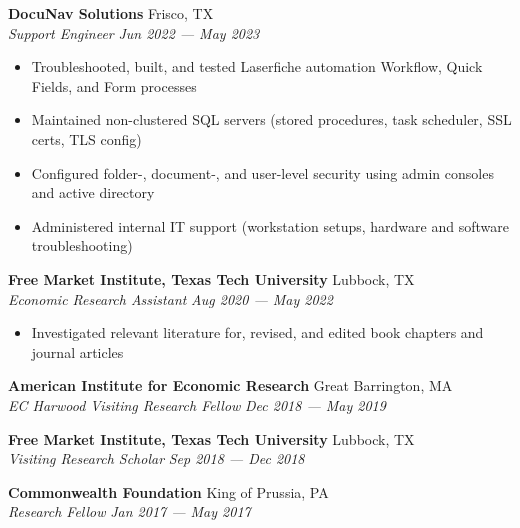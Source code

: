 \documentclass[a4paper,11pt]{article}
\begin{document}
\textbf{DocuNav Solutions} \hfill Frisco, TX \\
\textit{Support Engineer} \hfill  \textit{Jun 2022 --- May 2023} \\
\begin{itemize}
    \item Troubleshooted, built, and tested Laserfiche automation Workflow, Quick Fields, and Form processes
    \item Maintained non-clustered SQL servers (stored procedures, task scheduler, SSL certs, TLS config)
    \item Configured folder-, document-, and user-level security using admin consoles and active directory
    \item Administered internal IT support (workstation setups, hardware and software troubleshooting)
\end{itemize}    
\vspace{1mm}

\textbf{Free Market Institute, Texas Tech University} \hfill Lubbock, TX\\
\textit{Economic Research Assistant} \hfill  \textit{Aug 2020 --- May 2022} \\
\begin{itemize}
    \item Investigated relevant literature for, revised, and edited book chapters and journal articles
\end{itemize}
\vspace{1mm}

\textbf{American Institute for Economic Research} \hfill Great Barrington, MA\\
\textit{EC Harwood Visiting Research Fellow} \hfill  \textit{Dec 2018 --- May 2019}\\
\vspace{1mm}

\textbf{Free Market Institute, Texas Tech University} \hfill Lubbock, TX\\
\textit{Visiting Research Scholar} \hfill  \textit{Sep 2018 --- Dec 2018}\\
\vspace{1mm}

\textbf{Commonwealth Foundation} \hfill King of Prussia, PA\\
\textit{Research Fellow} \hfill  \textit{Jan 2017 --- May 2017}\\
\vspace{1mm}
\end{document}
